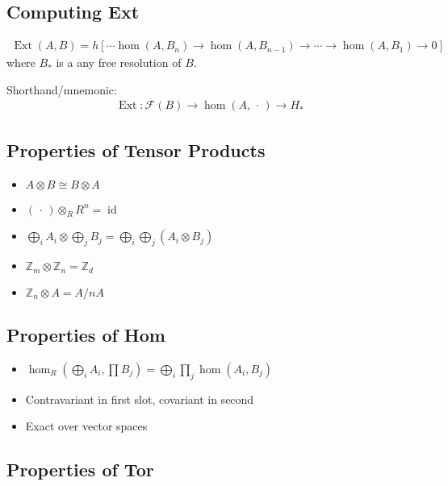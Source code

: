 \hypertarget{computing-ext}{%
\subsection{Computing Ext}\label{computing-ext}}

\begin{align*}
\operatorname{Ext}(A, B) = h[\cdots \hom(A, B_n) \to \hom(A, B_{n-1}) \to \cdots \to \hom(A, B_1) \to 0 ]
\end{align*}
where \(B_*\) is a any free resolution of \(B\).

Shorthand/mnemonic:
\begin{align*}
\operatorname{Ext}: \mathcal{F}(B) \to \hom(A, {\,\cdot\,}) \to H_*
\end{align*}

\hypertarget{properties-of-tensor-products}{%
\subsection{Properties of Tensor
Products}\label{properties-of-tensor-products}}

\begin{itemize}
\tightlist
\item
  \(A\otimes B \cong B\otimes A\)
\item
  \(({\,\cdot\,}) \otimes_R R^n = \operatorname{id}\)
\item
  \(\bigoplus_i A_i \otimes\bigoplus_j B_j = \bigoplus_i\bigoplus_j(A_i \otimes B_j)\)
\item
  \({\mathbb{Z}}_m \otimes{\mathbb{Z}}_n = {\mathbb{Z}}_d\)
\item
  \({\mathbb{Z}}_n \otimes A = A/nA\)
\end{itemize}

\hypertarget{properties-of-hom}{%
\subsection{Properties of Hom}\label{properties-of-hom}}

\begin{itemize}
\tightlist
\item
  \(\hom_R (\bigoplus_i A_i, \prod B_j) = \bigoplus_i \prod_j \hom(A_i, B_j)\)
\item
  Contravariant in first slot, covariant in second
\item
  Exact over vector spaces
\end{itemize}

\hypertarget{properties-of-tor}{%
\subsection{Properties of Tor}\label{properties-of-tor}}

